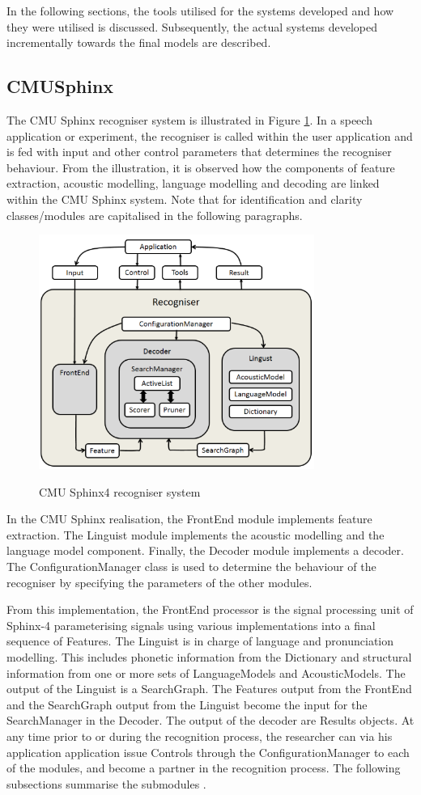 In the following sections, the tools utilised for the systems developed and how they were utilised is discussed.  Subsequently, the actual systems developed incrementally towards the final models are described.
\subsection{CMUSphinx}
The CMU Sphinx recogniser system is illustrated in Figure \ref{fig_c3_sphinx}.  In a speech application or experiment, the recogniser is called within the user application and is fed with input and other control parameters that determines the recogniser behaviour.  From the illustration, it is observed how the components of feature extraction, acoustic modelling, language modelling and decoding are linked within the CMU Sphinx system.  Note that for identification and clarity classes/modules are capitalised in the following paragraphs.
\begin{figure}
\centering
  \includegraphics[width=9cm]{thesis/images/sphinx}\\
  \caption{CMU Sphinx4 recogniser system }\label{fig_c3_sphinx}
\end{figure}
In the CMU Sphinx realisation, the FrontEnd module implements feature extraction.  The Linguist module implements the acoustic modelling and the language model component. Finally, the Decoder module implements a decoder.  The ConfigurationManager class is used to determine the behaviour of the recogniser by specifying  the parameters of the other modules.   

From this implementation, the FrontEnd processor is the signal processing unit of Sphinx-4 parameterising signals using various implementations into a final sequence of Features.  The Linguist is in charge of language and pronunciation modelling.  This includes phonetic information from the Dictionary and structural information from one or more sets of LanguageModels and AcousticModels.  The output of the Linguist is a SearchGraph.  The Features output from the FrontEnd and the SearchGraph output from the Linguist become the input for the SearchManager in the Decoder.  The output of the decoder are Results objects.  At any time prior to or during the recognition process, the researcher can via his application application issue Controls  through the ConfigurationManager to each of the modules, and become a partner in the recognition process.  The following subsections summarise the submodules \citep{walker2004sphinx}.
